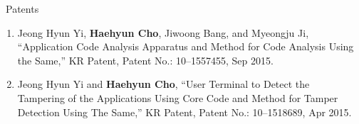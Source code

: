 \documentclass{resume} %
\begin{document}
\begin{rSection}{\faGenderless~Patents}
	
    \begin{enumerate}[leftmargin=0pt]
		\item Jeong Hyun Yi, \textbf{Haehyun Cho}, Jiwoong Bang, and Myeongju Ji,
		``Application Code Analysis Apparatus and Method for Code Analysis Using the Same,'' KR Patent, 
		Patent No.: 10--1557455, Sep 2015.

		\item Jeong Hyun Yi and \textbf{Haehyun Cho}, 
		``User Terminal to Detect the Tampering of the Applications Using Core Code and Method for Tamper Detection Using The Same,'' KR Patent, 
		Patent No.: 10--1518689, Apr 2015.
	\end{enumerate}
	
	\vspace{3mm}
\end{rSection}
\end{document}

